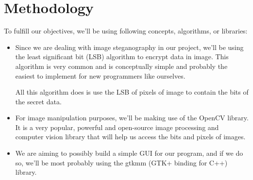 \section{Methodology}

To fulfill our objectives, we'll be using following concepts, algorithms,
or libraries:

\begin{itemize}
    \item{} Since we are dealing with image steganography in our project,
        we'll be using the least significant bit (LSB) algorithm to encrypt
        data in image. This algorithm is very common and is conceptually
        simple and probably the easiest to implement for new programmers like
        ourselves.

        All this algorithm does is use the LSB of pixels of image to
        contain the bits of the secret data.

    \item{} For image manipulation purposes, we'll be making use of the
        OpenCV library. It is a very popular, powerful and open-source
        image processing and computer vision library that will help us access
        the bits and pixels of images.

    \item{} We are aiming to possibly build a simple GUI for our program, and
        if we do so, we'll be most probably using the gtkmm (GTK+ binding for
        C++) library.
\end{itemize}
